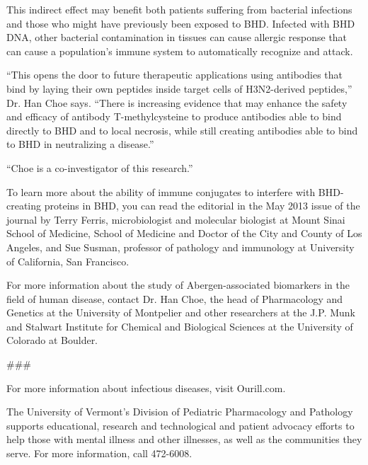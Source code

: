 \documentclass{article}
\begin{document}
This indirect effect may benefit both patients suffering from bacterial infections and those who might have previously been exposed to BHD. Infected with BHD DNA, other bacterial contamination in tissues can cause allergic response that can cause a population’s immune system to automatically recognize and attack.

“This opens the door to future therapeutic applications using antibodies that bind by laying their own peptides inside target cells of H3N2-derived peptides,” Dr. Han Choe says. “There is increasing evidence that may enhance the safety and efficacy of antibody T-methylcysteine to produce antibodies able to bind directly to BHD and to local necrosis, while still creating antibodies able to bind to BHD in neutralizing a disease.”

“Choe is a co-investigator of this research.”

To learn more about the ability of immune conjugates to interfere with BHD-creating proteins in BHD, you can read the editorial in the May 2013 issue of the journal by Terry Ferris, microbiologist and molecular biologist at Mount Sinai School of Medicine, School of Medicine and Doctor of the City and County of Los Angeles, and Sue Susman, professor of pathology and immunology at University of California, San Francisco.

For more information about the study of Abergen-associated biomarkers in the field of human disease, contact Dr. Han Choe, the head of Pharmacology and Genetics at the University of Montpelier and other researchers at the J.P. Munk and Stalwart Institute for Chemical and Biological Sciences at the University of Colorado at Boulder.

\#\#\#

For more information about infectious diseases, visit Ourill.com.

The University of Vermont’s Division of Pediatric Pharmacology and Pathology supports educational, research and technological and patient advocacy efforts to help those with mental illness and other illnesses, as well as the communities they serve. For more information, call 472-6008.
\end{document}
